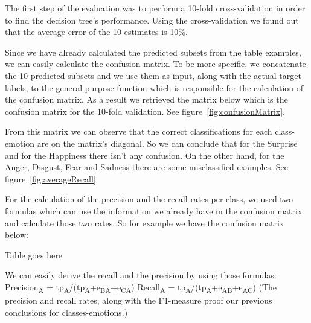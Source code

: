 The first step of the evaluation was to perform a 10-fold cross-validation in
order to find the decision tree's performance. Using the cross-validation we
found out that the average error of the 10 estimates is 10\%. 

Since we have already calculated the predicted subsets from the table examples, we can easily calculate the confusion matrix. To be more specific, we concatenate the 10 predicted subsets and we use them as input, along with the actual target labels, to the general purpose function which is responsible for the calculation of the confusion matrix.  As a result we retrieved the matrix below which is the confusion matrix for the 10-fold validation.
See figure~\ref{fig:confusionMatrix}.


From this matrix we can observe that the correct classifications for each
class-emotion are on the matrix's diagonal. So we can conclude that for the
Surprise and for the Happiness there isn't any confusion. On the other hand, for the Anger, Disgust, Fear and Sadness there are some misclassified examples. 
See figure~\ref{fig:averageRecall}


For the calculation of the precision and the recall rates per class, we used two formulas which can use the information we already have in the confusion matrix and calculate those two rates. So for example we have the confusion matrix below:

Table goes here

We can easily derive the recall and the precision by using those formulas:
Precision\textsubscript{A} =
tp\textsubscript{A}/(tp\textsubscript{A}+e\textsubscript{BA}+e\textsubscript{CA})
Recall\textsubscript{A} =
tp\textsubscript{A}/(tp\textsubscript{A}+e\textsubscript{AB}+e\textsubscript{AC})
(The precision and recall rates, along with the F1-measure proof our previous conclusions for classes-emotions.)
